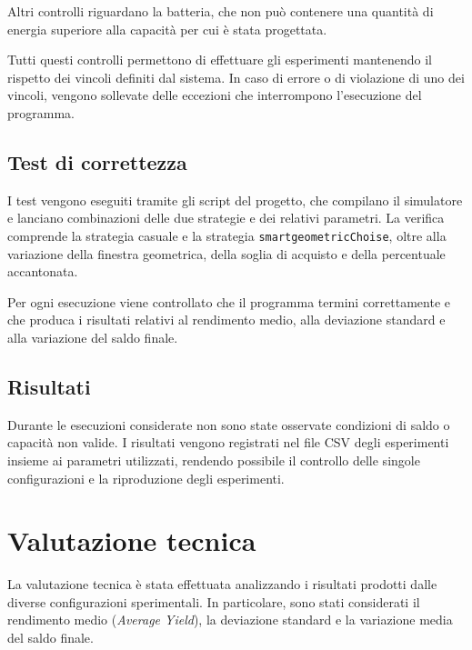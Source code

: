 \documentclass[a4paper,oneside,italian]{sapthesis}
\begin{document}
Altri controlli riguardano la batteria, che non può contenere una quantità di
energia superiore alla capacità per cui è stata progettata.

Tutti questi controlli permettono di effettuare gli esperimenti mantenendo
il rispetto dei vincoli definiti dal sistema. In caso di errore o di
violazione di uno dei vincoli, vengono sollevate delle eccezioni che
interrompono l'esecuzione del programma.

\subsection{Test di correttezza}

I test vengono eseguiti tramite gli script del progetto, che compilano il
simulatore e lanciano combinazioni delle due strategie e dei relativi
parametri. La verifica comprende la strategia casuale e la strategia \texttt{smartgeometricChoise}, oltre alla variazione della finestra geometrica, della soglia
di acquisto e della percentuale accantonata.

Per ogni esecuzione viene controllato che il programma termini correttamente
e che produca i risultati relativi al rendimento medio, alla deviazione
standard e alla variazione del saldo finale.

\subsection{Risultati}

Durante le esecuzioni considerate non sono state osservate condizioni di
saldo o capacità non valide. I risultati vengono registrati nel file CSV
degli esperimenti insieme ai parametri utilizzati, rendendo possibile
il controllo delle singole configurazioni e la riproduzione degli
esperimenti.

 
\section{Valutazione tecnica}

La valutazione tecnica è stata effettuata analizzando i risultati prodotti
dalle diverse configurazioni sperimentali. In particolare, sono stati
considerati il rendimento medio (\textit{Average Yield}), la deviazione
standard e la variazione media del saldo finale.
\end{document}

